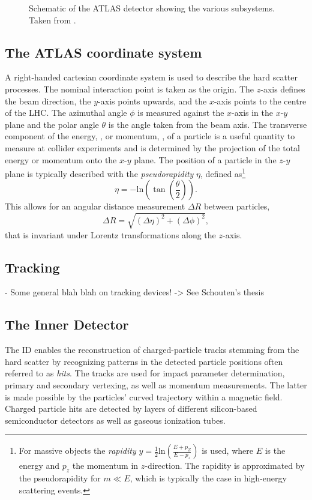 \begin{figure}
    \caption[Schematic of the ATLAS detector showing the various subsystems.]{Schematic of the ATLAS detector showing the various subsystems. Taken from .}
    \label{fig:ATLASlayout}
\end{figure}

\subsection{The ATLAS coordinate system}
A right-handed cartesian coordinate system is used to describe the hard scatter processes. The nominal interaction point is taken as the origin. The $z$-axis defines the beam direction, the $y$-axis points upwards, and the $x$-axis points to the centre of the LHC. The azimuthal angle $\phi$ is measured against the $x$-axis in the $x$-$y$ plane and the polar angle $\theta$ is the angle taken from the beam axis. 
The transverse component of the energy, \ET, or momentum, \pT, of a particle is a useful quantity to measure at collider experiments and is determined by the projection of the total energy or momentum onto the $x$-$y$ plane.
The position of a particle in the $z$-$y$ plane is typically described with the \emph{pseudorapidity} $\eta$, defined as\footnote{For massive objects the \emph{rapidity} $y = \frac{1}{2} \text{ln} \left( \frac{E + p_Z }{E-p_z} \right)$ is used, where $E$ is the energy and $p_z$ the momentum in $z$-direction. The rapidity is approximated by the pseudorapidity for $m \ll E$, which is typically the case in high-energy scattering events.}
\begin{equation}
    \eta = - \text{ln} \left( \tan \left( \frac{\theta}{2} \right) \right).
\end{equation}
This allows for an angular distance measurement $\Delta R$ between particles,
\begin{equation}
    \Delta R = \sqrt{ \left( \Delta \eta \right) ^2 + \left( \Delta \phi \right) ^2 },
\end{equation}
that is invariant under Lorentz transformations along the $z$-axis. 


\subsection{Tracking}
- Some general blah blah on tracking devices!
-> See Schouten's thesis


\subsection{The Inner Detector}
\label{subsec:inner-detector}
The ID enables the reconstruction of charged-particle tracks stemming from the hard scatter by recognizing patterns in the detected particle positions often referred to as \emph{hits}. The tracks are used for impact parameter determination, primary and secondary vertexing, as well as momentum measurements. The latter is made possible by the particles' curved trajectory within a magnetic field.
Charged particle hits are detected by layers of different silicon-based semiconductor detectors as well as gaseous ionization tubes.

